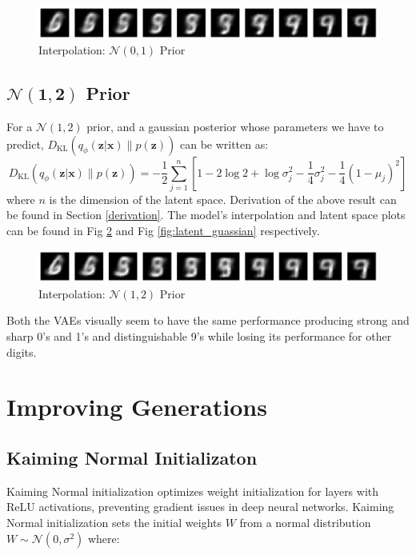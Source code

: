 \documentclass[12pt]{article}
\begin{document}
\begin{figure}[h]
\centering
\includegraphics[width=1\linewidth]{report_images/normal_vae/interpolation.png}
\caption{\label{fig:inter_normal}Interpolation: $\mathcal{N}(0,1)$ Prior}
\end{figure}



\subsection{$\boldsymbol{\mathcal{N}(1,2)}$ Prior}
For a $\mathcal{N}(1,2)$ prior, and a gaussian posterior whose parameters we have to predict, $D_{\text{KL}}(q_\phi(\mathbf{z}|\mathbf{x}) \| p(\mathbf{z}))$ can be written as:
\begin{equation}
D_{\text{KL}}(q_\phi(\mathbf{z}|\mathbf{x}) \| p(\mathbf{z})) = -\frac{1}{2}\sum_{j=1}^n \left[ 1 - 2\log2 + \log\sigma_j^2  - \frac{1}{4}\sigma_j^2 - \frac{1}{4}(1 - \mu_j)^2 \right]
\end{equation}
where $n$ is the dimension of the latent space. Derivation of the above result can be found in Section \ref{derivation}. The model's interpolation and latent space plots can be found in Fig \ref{fig:inter_guassian} and Fig \ref{fig:latent_guassian} respectively. 

\begin{figure}[h]
\centering
\includegraphics[width=1\linewidth]{report_images/gaussian_vae/interpolation.png}
\caption{\label{fig:inter_guassian}Interpolation: $\mathcal{N}(1,2)$ Prior}
\end{figure}

\noindent
Both the VAEs visually seem to have the same performance producing strong and sharp 0's and 1's and distinguishable 9's while losing its performance for other digits.

\section{Improving Generations}
\subsection{Kaiming Normal Initializaton}
Kaiming Normal initialization optimizes weight initialization for layers with ReLU activations, preventing gradient issues in deep neural networks. Kaiming Normal initialization sets the initial weights $W$ from a normal distribution $W \sim \mathcal{N}(0, \sigma^2)$ where:
\end{document}
